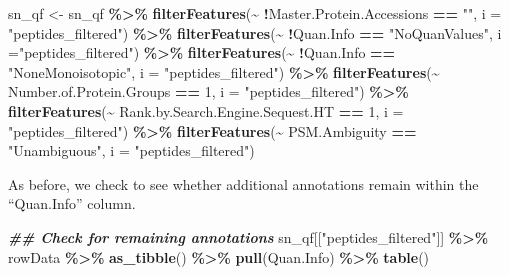 \documentclass[9pt,a4paper,]{extarticle}
\newenvironment{Shaded}{\begin{snugshade}}{\end{snugshade}}
\newcommand{\AttributeTok}[1]{\textcolor[rgb]{0.13,0.29,0.53}{#1}}
\newcommand{\DecValTok}[1]{\textcolor[rgb]{0.00,0.00,0.81}{#1}}
\newcommand{\DocumentationTok}[1]{\textcolor[rgb]{0.56,0.35,0.01}{\textbf{\textit{#1}}}}
\newcommand{\FunctionTok}[1]{\textcolor[rgb]{0.13,0.29,0.53}{\textbf{#1}}}
\newcommand{\NormalTok}[1]{#1}
\newcommand{\OtherTok}[1]{\textcolor[rgb]{0.56,0.35,0.01}{#1}}
\newcommand{\SpecialCharTok}[1]{\textcolor[rgb]{0.81,0.36,0.00}{\textbf{#1}}}
\newcommand{\StringTok}[1]{\textcolor[rgb]{0.31,0.60,0.02}{#1}}
\begin{document}
\begin{Shaded}
\begin{Highlighting}[]
\NormalTok{sn\_qf }\OtherTok{\textless{}{-}}\NormalTok{ sn\_qf }\SpecialCharTok{\%\textgreater{}\%}
  \FunctionTok{filterFeatures}\NormalTok{(}\SpecialCharTok{\textasciitilde{}} \SpecialCharTok{!}\NormalTok{Master.Protein.Accessions }\SpecialCharTok{==} \StringTok{""}\NormalTok{, }
                 \AttributeTok{i =} \StringTok{"peptides\_filtered"}\NormalTok{) }\SpecialCharTok{\%\textgreater{}\%}
  \FunctionTok{filterFeatures}\NormalTok{(}\SpecialCharTok{\textasciitilde{}} \SpecialCharTok{!}\NormalTok{Quan.Info }\SpecialCharTok{==} \StringTok{"NoQuanValues"}\NormalTok{, }
                 \AttributeTok{i =}\StringTok{"peptides\_filtered"}\NormalTok{) }\SpecialCharTok{\%\textgreater{}\%}
  \FunctionTok{filterFeatures}\NormalTok{(}\SpecialCharTok{\textasciitilde{}} \SpecialCharTok{!}\NormalTok{Quan.Info }\SpecialCharTok{==} \StringTok{"NoneMonoisotopic"}\NormalTok{,}
                 \AttributeTok{i =} \StringTok{"peptides\_filtered"}\NormalTok{) }\SpecialCharTok{\%\textgreater{}\%}
  \FunctionTok{filterFeatures}\NormalTok{(}\SpecialCharTok{\textasciitilde{}}\NormalTok{ Number.of.Protein.Groups }\SpecialCharTok{==} \DecValTok{1}\NormalTok{, }
                 \AttributeTok{i =} \StringTok{"peptides\_filtered"}\NormalTok{) }\SpecialCharTok{\%\textgreater{}\%}
  \FunctionTok{filterFeatures}\NormalTok{(}\SpecialCharTok{\textasciitilde{}}\NormalTok{ Rank.by.Search.Engine.Sequest.HT }\SpecialCharTok{==} \DecValTok{1}\NormalTok{, }
                 \AttributeTok{i =} \StringTok{"peptides\_filtered"}\NormalTok{) }\SpecialCharTok{\%\textgreater{}\%}
  \FunctionTok{filterFeatures}\NormalTok{(}\SpecialCharTok{\textasciitilde{}}\NormalTok{ PSM.Ambiguity }\SpecialCharTok{==} \StringTok{"Unambiguous"}\NormalTok{,}
                 \AttributeTok{i =} \StringTok{"peptides\_filtered"}\NormalTok{)}
\end{Highlighting}
\end{Shaded}

As before, we check to see whether additional annotations remain within the
``Quan.Info'' column.

\begin{Shaded}
\begin{Highlighting}[]
\DocumentationTok{\#\# Check for remaining annotations}
\NormalTok{sn\_qf[[}\StringTok{"peptides\_filtered"}\NormalTok{]] }\SpecialCharTok{\%\textgreater{}\%}
\NormalTok{  rowData }\SpecialCharTok{\%\textgreater{}\%}
  \FunctionTok{as\_tibble}\NormalTok{() }\SpecialCharTok{\%\textgreater{}\%}
  \FunctionTok{pull}\NormalTok{(Quan.Info) }\SpecialCharTok{\%\textgreater{}\%}
  \FunctionTok{table}\NormalTok{()}
\end{Highlighting}
\end{Shaded}
\end{document}

